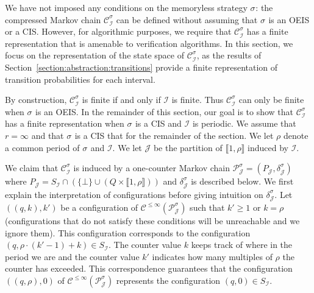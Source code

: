 \documentclass[a4paper,UKenglish,cleveref,autoref,thm-restate,colorlinks]{lipics-v2021}
\newcommand{\integerInterval}[1]{\llbracket{}#1\rrbracket{}}
\newcommand{\mdpStateSpace}{S}
\newcommand{\ocStateSpace}{Q}
\newcommand{\ocState}{q}
\newcommand{\ocCount}{k}
\newcommand{\ocCountB}{k'}
\newcommand{\ocTrans}{\delta}
\newcommand{\counterUB}{r}
\newcommand{\period}{\rho}
\newcommand{\mchain}{\mathcal{C}}
\newcommand{\ocChain}{\mathcal{P}}
\newcommand{\ocChainFin}[2]{\mchain^{\leq #2}(#1)}
\newcommand{\intPart}{\mathcal{I}}
\newcommand{\intPartB}{\mathcal{J}}
\newcommand{\compressChainStrat}[1]{\mchain^{#1}_{\intPart}}
\newcommand{\compressChain}{\compressChainStrat{\strat}}
\newcommand{\compressChainStateSpace}{\mdpStateSpace_{\intPart}}
\newcommand{\cisChainStrat}[1]{\ocChain^{#1}_{\intPartB}}
\newcommand{\cisChain}{\cisChainStrat{\strat}}
\newcommand{\cisChainStateSpace}{P_{\intPartB}}
\newcommand{\cisChainTransTemplate}[2]{\ocTrans_{#1}^{#2}}
\newcommand{\cisChainTrans}{\cisChainTransTemplate{\intPartB}{\strat}}
\newcommand{\stratGeneric}[1]{{\sigma_{#1}}}
\newcommand{\strat}{\stratGeneric{}}
\begin{document}
We have not imposed any conditions on the memoryless strategy $\strat$: the compressed Markov chain $\compressChain$ can be defined without assuming that $\strat$ is an OEIS or a CIS.
However, for algorithmic purposes, we require that $\compressChain$ has a finite representation that is amenable to verification algorithms.
In this section, we focus on the representation of the state space of $\compressChain$, as the results of Section~\ref{section:abstraction:transitions} provide a finite representation of transition probabilities for each interval.

By construction, $\compressChain$ is finite if and only if $\intPart$ is finite.
Thus $\compressChain$ can only be finite when $\strat$ is an OEIS.
In the remainder of this section, our goal is to show that $\compressChain$ has a finite representation when $\strat$ is a CIS and $\intPart$ is periodic.
We assume that $\counterUB=\infty$ and that $\strat$ is a CIS that for the remainder of the section.
We let $\period$ denote a common period of $\strat$ and $\intPart$.
We let $\intPartB$ be the partition of $\integerInterval{1, \period}$ induced by $\intPart$.

We claim that $\compressChain$ is induced by a one-counter Markov chain $\cisChain=(\cisChainStateSpace, \cisChainTrans)$  where $\cisChainStateSpace = \compressChainStateSpace\cap(\{\bot\}\cup(\ocStateSpace\times\integerInterval{1, \period}))$  and $\cisChainTrans$ is described below.
We first explain the interpretation of configurations before giving intuition on $\cisChainTrans$.
Let $((\ocState, \ocCount), \ocCountB)$ be a configuration of $\ocChainFin{\cisChain}{\infty}$ such that $\ocCountB\geq 1$ or $\ocCount=\period$ (configurations that do not satisfy these conditions will be unreachable and we ignore them).
This configuration corresponds to the configuration $(\ocState, \period\cdot(\ocCount'-1) +\ocCount)\in\compressChainStateSpace$.
The counter value $\ocCount$ keeps track of where in the period we are and the counter value $\ocCount'$ indicates how many multiples of $\period$ the counter has exceeded.
This correspondence guarantees that the configuration $((\ocState, \period), 0)$ of $\ocChainFin{\cisChain}{\infty}$ represents the configuration $(\ocState, 0)\in\compressChainStateSpace$.
\end{document}
